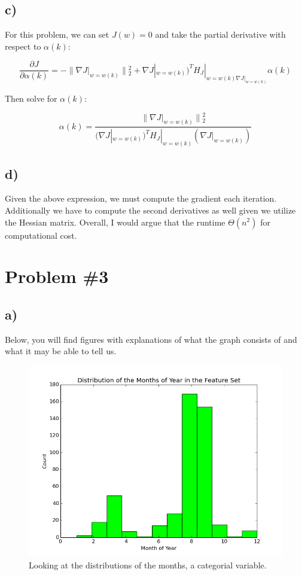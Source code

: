\documentclass[12pt]{article}
\let\Oldsection\section
\renewcommand{\section}{\FloatBarrier\Oldsection}
\let\Oldsubsection\subsection
\renewcommand{\subsection}{\FloatBarrier\Oldsubsection}
\begin{document}
\subsection*{c)}

For this problem, we can set $J(w) = 0$ and take the partial derivative with respect to $\alpha(k)$:

$$ \frac{\partial J}{\partial \alpha(k)} = 
- \parallel{\nabla J|_{w=w(k)}}\parallel{}_{2}^{2} + \nabla J|_{w=w(k)})^{T}H_J|_{w=w(k) 
\nabla J|_{w=w(k)}} \alpha(k) $$

Then solve for $\alpha(k)$:

$$ \alpha(k) = \frac{\parallel{\nabla J|_{w=w(k)}}\parallel{}_{2}^{2}}
{(\nabla J|_{w=w(k)})^{T} H_J|_{w=w(k)} (\nabla J|_{w=w(k)})} $$

\subsection*{d)}

Given the above expression, we must compute the gradient each iteration. 
Additionally we have to compute the second derivatives as well given we 
utilize the Hessian matrix. Overall, I would argue that the runtime $\Theta(n^2)$
for computational cost.

\section*{Problem \#3}

\subsection*{a)}

Below, you will find figures with explanations of what the graph consists of 
and what it may be able to tell us. 


\begin{figure}[!htb]
\begin{center}
  \includegraphics[scale=0.4]{month-distribution.png}
  \caption{Looking at the distributions of the months, a categorial variable.}
\end{center}
\end{figure}
\end{document}
